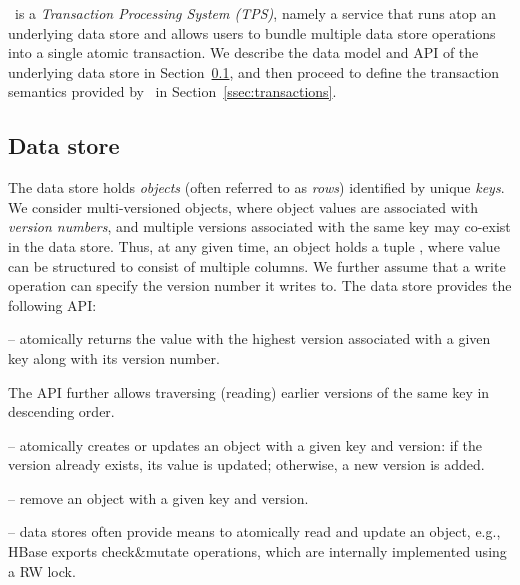 

\sys\ is a \emph{Transaction Processing System (TPS)}, namely a service that runs atop an underlying data store and 
allows users to bundle multiple data store operations into a single atomic transaction. 
We describe the data model and API of the underlying data store in Section~\ref{ssec:data-model}, and 
then proceed to define  the transaction semantics provided by \sys\ in Section~\ref{ssec:transactions}. 

\subsection{Data store}
\label{ssec:data-model}

The  data store holds  \emph{objects} (often referred to as \emph{rows}) identified by unique \emph{keys}.
We consider multi-versioned objects, where object values are associated with \emph{version numbers}, and
multiple versions associated with the same key may co-exist in the data store.
Thus, at any given time, an object holds a tuple , where value
can be structured to consist of multiple columns.
We further assume that a write operation can specify the version number it writes to.
The  data store provides the following API:
\begin{description}
\item [] -- atomically returns the value with
the highest version associated with a given key along with its version number.
\item The API further allows traversing (reading) earlier versions of the same
key in descending order.
\item [\code{put}] -- atomically creates or updates an object with a given key and version:
if the version already exists, its value is updated;
otherwise, a new version is added. 
\item [\code{remove}] -- remove an object with a given key and version.
\item [\code{check\&mutate}] --  data stores often provide means to atomically read and
update an object, e.g., HBase exports check\&mutate operations, which are 
internally implemented using a RW lock.
\end{description}


